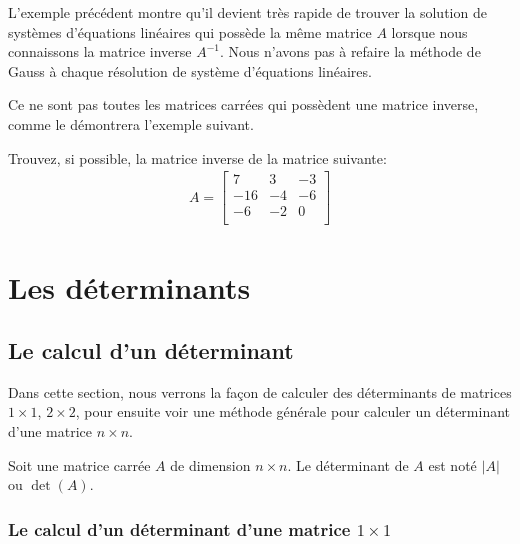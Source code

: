 \documentclass[]{book}
\theoremstyle{definition}
\theoremstyle{definition}
\theoremstyle{definition}
\theoremstyle{remark}
\let\BeginKnitrBlock\begin \let\EndKnitrBlock\end
\begin{document}
L'exemple précédent montre qu'il devient très rapide de trouver la solution de systèmes d'équations linéaires qui possède la même matrice \(A\) lorsque nous connaissons la matrice inverse \(A^{-1}\). Nous n'avons pas à refaire la méthode de Gauss à chaque résolution de système d'équations linéaires.

Ce ne sont pas toutes les matrices carrées qui possèdent une matrice inverse, comme le démontrera l'exemple suivant.

\BeginKnitrBlock{example}
\protect\hypertarget{exm:unnamed-chunk-81}{}{\label{exm:unnamed-chunk-81} }Trouvez, si possible, la matrice inverse de la matrice suivante:
\begin{align*}
A=\begin{bmatrix}
7&3&-3\\
-16&-4&-6\\
-6&-2&0\\
\end{bmatrix}
\end{align*}
\EndKnitrBlock{example}

\hypertarget{determinants}{%
\chapter{Les déterminants}\label{determinants}}

\hypertarget{le-calcul-dun-determinant}{%
\section{Le calcul d'un déterminant}\label{le-calcul-dun-determinant}}

Dans cette section, nous verrons la façon de calculer des déterminants de matrices \(1\times 1\), \(2\times 2\), pour ensuite voir une méthode générale pour calculer un déterminant d'une matrice \(n\times n\).

\BeginKnitrBlock{definition}[Le déterminant d'une matrice]
\protect\hypertarget{def:unnamed-chunk-82}{}{\label{def:unnamed-chunk-82} {} }Soit une matrice carrée \(A\) de dimension \(n\times n\). Le déterminant de \(A\) est noté \(\vert A\vert\) ou \(\det (A)\).
\EndKnitrBlock{definition}

\hypertarget{le-calcul-dun-determinant-dune-matrice-1-times-1}{%
\subsection{\texorpdfstring{Le calcul d'un déterminant d'une matrice \(1 \times 1\)}{Le calcul d'un déterminant d'une matrice 1 \textbackslash times 1}}\label{le-calcul-dun-determinant-dune-matrice-1-times-1}}
\end{document}
